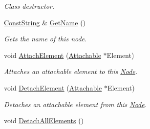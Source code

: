 \begin{DoxyCompactItemize}
\begin{DoxyCompactList}\small\item\em Class destructor. \item\end{DoxyCompactList}\item 
\hyperlink{namespacephys_a5ce5049f8b4bf88d6413c47b504ebb31}{ConstString} \& \hyperlink{classphys_1_1WorldNode_ad8a5650d5fb9f804b863c434ffab2cc1}{GetName} ()
\begin{DoxyCompactList}\small\item\em Gets the name of this node. \item\end{DoxyCompactList}\item 
void \hyperlink{classphys_1_1WorldNode_a82710a08f767447266c1307b55a5636b}{AttachElement} (\hyperlink{classphys_1_1Attachable}{Attachable} $\ast$Element)
\begin{DoxyCompactList}\small\item\em Attaches an attachable element to this \hyperlink{classNode}{Node}. \item\end{DoxyCompactList}\item 
void \hyperlink{classphys_1_1WorldNode_ab5ce9ccc5dea9a450f3f72442ca10cf5}{DetachElement} (\hyperlink{classphys_1_1Attachable}{Attachable} $\ast$Element)
\begin{DoxyCompactList}\small\item\em Detaches an attachable element from this \hyperlink{classNode}{Node}. \item\end{DoxyCompactList}\item 
\hypertarget{classphys_1_1WorldNode_acf433bc8dbe404cbaf4cb9e2264a7a84}{
void \hyperlink{classphys_1_1WorldNode_acf433bc8dbe404cbaf4cb9e2264a7a84}{DetachAllElements} ()}
\label{d2/d3e/classphys_1_1WorldNode_acf433bc8dbe404cbaf4cb9e2264a7a84}


\end{DoxyCompactItemize}
